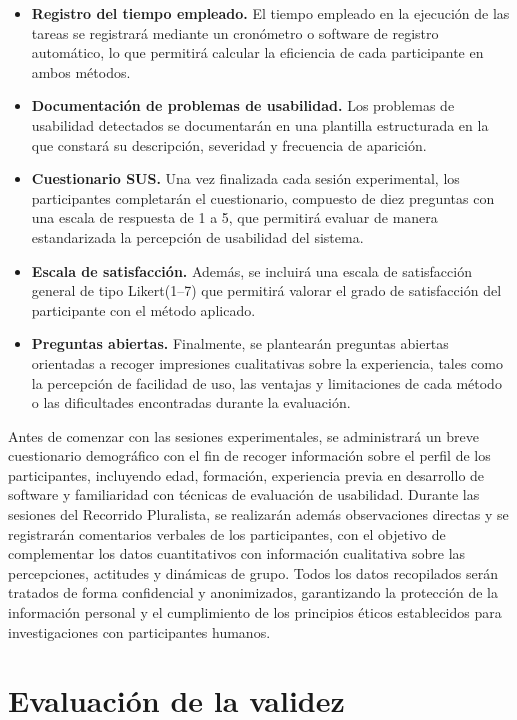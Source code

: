 \documentclass[a4paper,12pt]{report}
\begin{document}
\begin{itemize}
    \item \textbf{Registro del tiempo empleado.} El tiempo empleado en la ejecución de las tareas se registrará mediante un cronómetro o software de registro automático, lo que permitirá calcular la eficiencia de cada participante en ambos métodos. 
    \item \textbf{Documentación de problemas de usabilidad.} Los problemas de usabilidad detectados se documentarán en una plantilla estructurada en la que constará su descripción, severidad y frecuencia de aparición.
    \item \textbf{Cuestionario SUS.} Una vez finalizada cada sesión experimental, los participantes completarán el cuestionario, compuesto de diez preguntas con una escala de respuesta de 1 a 5, que permitirá evaluar de manera estandarizada la percepción de usabilidad del sistema.
    \item \textbf{Escala de satisfacción.} Además, se incluirá una escala de satisfacción general de tipo Likert(1--7) que permitirá valorar el grado de satisfacción del participante con el método aplicado.
    \item \textbf{Preguntas abiertas.} Finalmente, se plantearán preguntas abiertas orientadas a recoger impresiones cualitativas sobre la experiencia, tales como la percepción de facilidad de uso, las ventajas y limitaciones de cada método o las dificultades encontradas durante la evaluación.  
\end{itemize}

Antes de comenzar con las sesiones experimentales, se administrará un breve cuestionario demográfico con el fin de recoger información sobre el perfil de los participantes, incluyendo 
edad, formación, experiencia previa en desarrollo de software y familiaridad con técnicas de evaluación de usabilidad. Durante las 
sesiones del Recorrido Pluralista, se realizarán además observaciones directas y se registrarán comentarios verbales de los participantes, con el objetivo 
de complementar los datos cuantitativos con información cualitativa sobre las percepciones, actitudes y dinámicas de grupo. Todos los datos recopilados 
serán tratados de forma confidencial y anonimizados, garantizando la protección de la información personal y el cumplimiento de los principios éticos establecidos
para investigaciones con participantes humanos.





\section{Evaluación de la validez}
\end{document}
